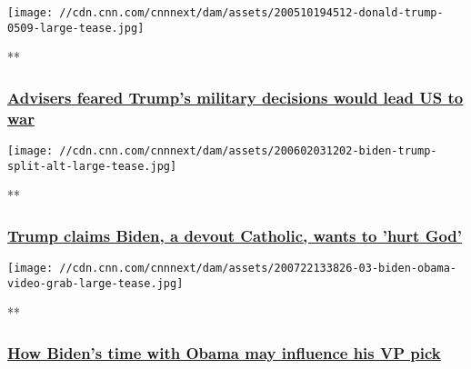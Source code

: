 \href{/videos/politics/2020/08/06/trump-advisers-military-fears-sciutto-vpx.cnn/video/playlists/this-week-in-politics/}{}

\texttt{[image: //cdn.cnn.com/cnnnext/dam/assets/200510194512-donald-trump-0509-large-tease.jpg]}

**

\hypertarget{advisers-feared-trumps-military-decisions-would-lead-us-to-war}{%
\subsubsection{\texorpdfstring{\href{/videos/politics/2020/08/06/trump-advisers-military-fears-sciutto-vpx.cnn/video/playlists/this-week-in-politics/}{Advisers
feared Trump's military decisions would lead US to
war}}{Advisers feared Trump's military decisions would lead US to war}}\label{advisers-feared-trumps-military-decisions-would-lead-us-to-war}}

\href{/videos/politics/2020/08/06/joe-biden-hurt-god-donald-trump-sot-diamond-lklv-lead-vpx.cnn/video/playlists/this-week-in-politics/}{}

\texttt{[image: //cdn.cnn.com/cnnnext/dam/assets/200602031202-biden-trump-split-alt-large-tease.jpg]}

**

\hypertarget{trump-claims-biden-a-devout-catholic-wants-to-hurt-god}{%
\subsubsection{\texorpdfstring{\href{/videos/politics/2020/08/06/joe-biden-hurt-god-donald-trump-sot-diamond-lklv-lead-vpx.cnn/video/playlists/this-week-in-politics/}{Trump
claims Biden, a devout Catholic, wants to 'hurt
God'}}{Trump claims Biden, a devout Catholic, wants to 'hurt God'}}\label{trump-claims-biden-a-devout-catholic-wants-to-hurt-god}}

\href{/videos/politics/2020/08/07/biden-obama-relationship-examined-vp-pick-zeleny-pkg-lead-vpx.cnn/video/playlists/this-week-in-politics/}{}

\texttt{[image: //cdn.cnn.com/cnnnext/dam/assets/200722133826-03-biden-obama-video-grab-large-tease.jpg]}

**

\hypertarget{how-bidens-time-with-obama-may-influence-his-vp-pick}{%
\subsubsection{\texorpdfstring{\href{/videos/politics/2020/08/07/biden-obama-relationship-examined-vp-pick-zeleny-pkg-lead-vpx.cnn/video/playlists/this-week-in-politics/}{How
Biden's time with Obama may influence his VP
pick}}{How Biden's time with Obama may influence his VP pick}}\label{how-bidens-time-with-obama-may-influence-his-vp-pick}}

